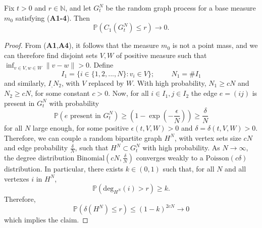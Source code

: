 \begin{lemma}\label{lemma: lower bound on largest cluster} Fix $t>0$ and $r\in \mathbb{N}$, and let $G^N_t$ be the random graph process for a base measure $m_0$ satisfying (\textbf{A1-4}). Then \begin{equation}
    \mathbb{P}(C_1(G^N_t)\leq r)\rightarrow 0.
\end{equation} \end{lemma} \begin{proof} From (\textbf{A1},\textbf{A4}), it follows that the measure $m_0$ is not a point mass, and we can therefore find disjoint sets $V, W$ of positive measure such that $\inf_{v \in V, w \in W} \|v-w\|>0$. Define \begin{equation} I_1=\{i \in \{1,2,...,N\}: v_i \in V\}; \hspace{1cm} N_1=\#I_1
\end{equation} and similarly, $I_, N_2$, with $V$ replaced by $W$. With high probability, $N_1\geq cN$ and $N_2\geq cN$, for some constant $c>0$. Now, for all $i\in I_1, j\in I_2$ the edge $e=(ij)$ is present in $G^N_t$ with probability \begin{equation}
    \mathbb{P}(e \text{ present in }G^N_t) \geq \left(1-\exp\left(-\frac{\epsilon}{N}\right)\right) \geq \frac{\delta}{N}
\end{equation} for all $N$ large enough, for some positive $\epsilon(t, V, W)>0$ and $\delta=\delta(t, V, W)>0$. \medskip \\ Therefore, we can couple a random bipartite graph $H^N$, with vertex sets size $cN$ and edge probability $\frac{\delta}{N}$, such that $H^N \subset G^N_t$ with high probability. As $N\rightarrow \infty$, the degree distribution $\text{Binomial}(cN,\frac{\delta}{N})$ converges weakly to a $\text{Poisson}(c\delta)$ distribution. In particular, there exists $k\in (0,1)$ such that, for all $N$ and all vertexes $i$ in $H^N$, \begin{equation}
    \mathbb{P}(\text{deg}_{H^N}(i)>r) \geq k.
\end{equation} Therefore, \begin{equation}
    \mathbb{P}(\delta(H^N)\le r) \le (1-k)^{2cN} \rightarrow 0
\end{equation} which implies the claim.  \end{proof} 
